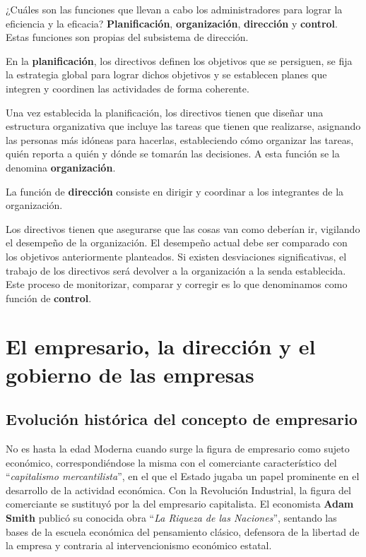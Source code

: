 \documentclass[12pt,a4paper,spanish]{report}
\begin{document}
			¿Cuáles son las funciones que llevan a cabo los administradores para lograr la eficiencia y la eficacia? \textbf{Planificación}, \textbf{organización}, \textbf{dirección} y \textbf{control}. Estas funciones son propias del subsistema de dirección.

			En la \textbf{planificación}, los directivos definen los objetivos que se persiguen, se fija la estrategia global para lograr dichos objetivos y se establecen planes que integren y coordinen las actividades de forma coherente.

			Una vez establecida la planificación, los directivos tienen que diseñar una estructura organizativa que incluye las tareas que tienen que realizarse, asignando las personas más idóneas para hacerlas, estableciendo cómo organizar las tareas, quién reporta a quién y dónde se tomarán las decisiones. A esta función se la denomina \textbf{organización}.

			La función de \textbf{dirección} consiste en dirigir y coordinar a los integrantes de la organización.

			Los directivos tienen que asegurarse que las cosas van como deberían ir, vigilando el desempeño de la organización. El desempeño actual debe ser comparado con los objetivos anteriormente planteados. Si existen desviaciones significativas, el trabajo de los directivos será devolver a la organización a la senda establecida. Este proceso de monitorizar, comparar y corregir es lo que denominamos como función de \textbf{control}.

\chapter{\textcolor[rgb]{0.9,0.3,0.3}{El empresario, la dirección y el gobierno de las empresas}}
	\section{\textcolor[rgb]{0.9,0.3,0.3}Evolución histórica del concepto de empresario}
		No es hasta la edad Moderna cuando surge la figura de empresario como sujeto económico, correspondiéndose la misma con el comerciante característico del ``\textcolor[rgb]{0.9,0.3,0.3}{\emph{capitalismo mercantilista}}'', en el que el Estado jugaba un papel prominente en el desarrollo de la actividad económica. Con la Revolución Industrial, la figura del comerciante se sustituyó por la del empresario capitalista. El economista \textbf{Adam Smith} publicó su conocida obra ``\textcolor[rgb]{0.9,0.3,0.3}{\emph{La Riqueza de las Naciones}}'', sentando las bases de la escuela económica del pensamiento clásico, defensora de la libertad de la empresa y contraria al intervencionismo económico estatal.
\end{document}
